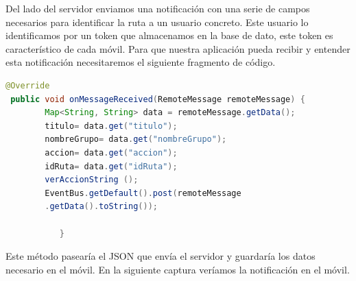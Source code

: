 Del lado del servidor enviamos una notificación con una serie de campos necesarios para identificar la ruta a un usuario concreto. Este usuario lo identificamos por un token que almacenamos en la base de dato, este token es característico de cada móvil. Para que nuestra aplicación  pueda recibir y entender esta notificación necesitaremos el siguiente fragmento de código.
	\begin{lstlisting}[language=java,caption={Recepción de mensajes},label=DescriptiveLabel]
 @Override
 public void onMessageReceived(RemoteMessage remoteMessage) {
        Map<String, String> data = remoteMessage.getData();
        titulo= data.get("titulo");
        nombreGrupo= data.get("nombreGrupo");
        accion= data.get("accion");
        idRuta= data.get("idRuta");
        verAccionString ();
        EventBus.getDefault().post(remoteMessage
        .getData().toString());
       
           }

\end{lstlisting}
Este método pasearía el JSON que envía el servidor y guardaría los datos necesario en el móvil.
En la siguiente captura veríamos la notificación en el móvil.	
	
